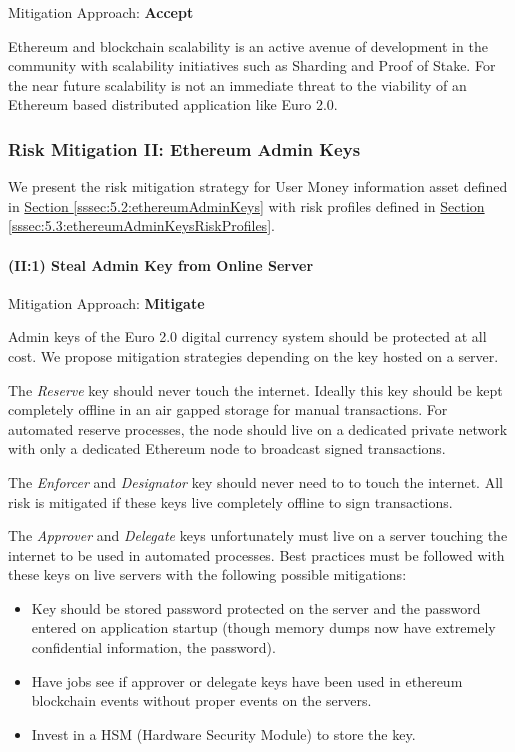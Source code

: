 \documentclass[a4paper,12pt]{article} %
\newcommand{\hypersectionref}[1]{\hyperref[#1]{Section \ref{#1}}}
\begin{document}
{Mitigation Approach: \textbf{Accept}

Ethereum and blockchain scalability is an active avenue of development in the community with scalability initiatives such as Sharding\cite{shardingFaq} and Proof of Stake\cite{proofOfStakeFaq}. For the near future scalability is not an immediate threat to the viability of an Ethereum based distributed application like Euro 2.0.

\subsubsection{Risk Mitigation II: Ethereum Admin Keys} \label{sssec:5.4:riskMitigationEthereumAdminKeys}

We present the risk mitigation strategy for User Money information asset defined in \hypersectionref{sssec:5.2:ethereumAdminKeys} with risk profiles defined in \hypersectionref{sssec:5.3:ethereumAdminKeysRiskProfiles}.

\paragraph{(II:1) Steal Admin Key from Online Server}

Mitigation Approach: \textbf{Mitigate}

Admin keys of the Euro 2.0 digital currency system should be protected at all cost. We propose mitigation strategies depending on the key hosted on a server.

The \textit{Reserve} key should never touch the internet. Ideally this key should be kept completely offline in an air gapped storage for manual transactions. For automated reserve processes, the node should live on a dedicated private network with only a dedicated Ethereum node to broadcast signed transactions.

The \textit{Enforcer} and \textit{Designator} key should never need to to touch the internet. All risk is mitigated if these keys live completely offline to sign transactions.

The \textit{Approver} and \textit{Delegate} keys unfortunately must live on a server touching the internet to be used in automated processes. Best practices must be followed with these keys on live servers with the following possible mitigations:

\begin{itemize}
	\item Key should be stored password protected on the server and the password entered on application startup (though memory dumps now have extremely confidential information, the password).
	\item Have jobs see if approver or delegate keys have been used in ethereum blockchain events without proper events on the servers.
	\item Invest in a HSM (Hardware Security Module) to store the key.
\end{itemize}

}
\end{document}
